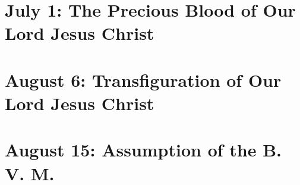 {%
{
\global\let\psalmclefthree=\undefined
\section{July 1: The Precious Blood of Our Lord Jesus Christ}
\subtitle{ Class}
\subtitle{I \& II Vespers}

\def\definevesperspropers{
  \def\prepsalmfive{\greseteolcustos{manual}}
}
\def\definevesperspropersalt{}
\def\vesperspropersnote{At II Vespers:}
\def\vesperspropersaltnote{At I Vespers:}
\def\premagverses{\greseteolcustos{manual}}

\def\begincollectcols{\begin{parcolumns}[rulebetween,colwidths={1=0.45\linewidth}]{2}}
\bigskip
\benedicamusdomino{}
}

{
\section{August 6: Transfiguration of Our Lord Jesus Christ}
\subtitle{ Class}
\subtitle{I \& II Vespers}

\def\definevesperspropers{
  \def\prepsalmfive{\greseteolcustos{manual}}
}
\def\definevesperspropersalt{}
\def\vesperspropersnote{At II Vespers:}
\def\vesperspropersaltnote{At I Vespers:}
\def\premagverses{\greseteolcustos{manual}}

\def\begincollectcols{\begin{parcolumns}[rulebetween,colwidths={1=0.44\linewidth}]{2}}
\bigskip
\benedicamusdomino{}
}

{
\section{August 15: Assumption of the B. V. M.}
\subtitle{ Class}
\subtitle{I \& II Vespers}

\def\definevesperspropers{
  \def\prepsalmfive{\greseteolcustos{manual}}
}
\def\definevesperspropersalt{}
\def\vesperspropersnote{At II Vespers:}
\def\vesperspropersaltnote{At I Vespers:}
\def\premagverses{\greseteolcustos{manual}}
\def\printfullhymn{
  {
    \oldneedspace{3\baselineskip}
    \printnote{At II Vespers: Hymn. \emph{Ave Maris Stella}, page \pageref{hymn-avemarisstella}. \Vbar{} \emph{Exaltata.} page \pageref{vr-assumption}.\\}

}}}}
